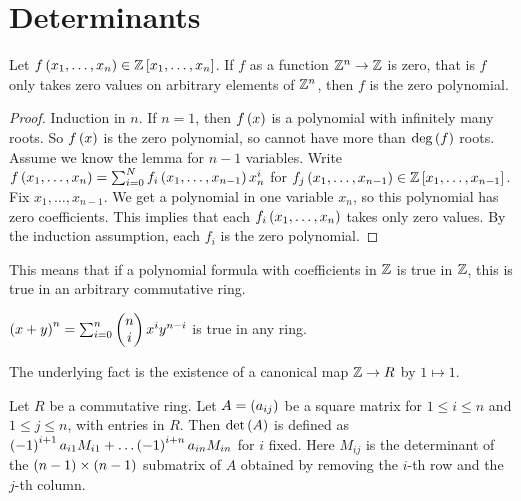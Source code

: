 \pagebreak

\section{Determinants}


\begin{lemma}
Let $ f\left( x_1, \dots, x_n \right) \in \mathbb{Z}\left[ x_1, \dots, x_n \right] $. If $ f $ as a function $ \mathbb{Z}^n \to \mathbb{Z} $ is zero, that is $ f $ only takes zero values on arbitrary elements of $ \mathbb{Z}^n $, then $ f $ is the zero polynomial.
\end{lemma}

\begin{proof}
Induction in $ n $. If $ n = 1 $, then $ f\left( x \right) $ is a polynomial with infinitely many roots. So $ f\left( x \right) $ is the zero polynomial, so cannot have more than $ \deg\left( f \right) $ roots. Assume we know the lemma for $ n - 1 $ variables. Write $ f\left( x_1, \dots, x_n \right) = \sum_{i = 0}^N f_i\left( x_1, \dots, x_{n - 1} \right)x_n^i $ for $ f_j\left( x_1, \dots, x_{n - 1} \right) \in \mathbb{Z}\left[ x_1, \dots, x_{n - 1} \right] $. Fix $ x_1, \dots, x_{n - 1} $. We get a polynomial in one variable $ x_n $, so this polynomial has zero coefficients. This implies that each $ f_i\left( x_1, \dots, x_n \right) $ takes only zero values. By the induction assumption, each $ f_i $ is the zero polynomial.
\end{proof}

\begin{remark}
\label{rem:7.2}
This means that if a polynomial formula with coefficients in $ \mathbb{Z} $ is true in $ \mathbb{Z} $, this is true in an arbitrary commutative ring.
\end{remark}

\begin{example*}
$ \left( x + y \right)^n = \sum_{i = 0}^n \begin{pmatrix} n \\ i \end{pmatrix}x^iy^{n - i} $ is true in any ring.
\end{example*}

The underlying fact is the existence of a canonical map $ \mathbb{Z} \to R $ by $ 1 \mapsto 1 $.

\begin{definition}
Let $ R $ be a commutative ring. Let $ A = \left( a_{ij} \right) $ be a square matrix for $ 1 \le i \le n $ and $ 1 \le j \le n $, with entries in $ R $. Then $ \det\left( A \right) $ is defined as $ \left( -1 \right)^{i + 1}a_{i1}M_{i1} + \dots \left( -1 \right)^{i + n}a_{in}M_{in} $ for $ i $ fixed. Here $ M_{ij} $ is the determinant of the $ \left( n - 1 \right) \times \left( n - 1 \right) $ submatrix of $ A $ obtained by removing the $ i $-th row and the $ j $-th column.
\end{definition}

